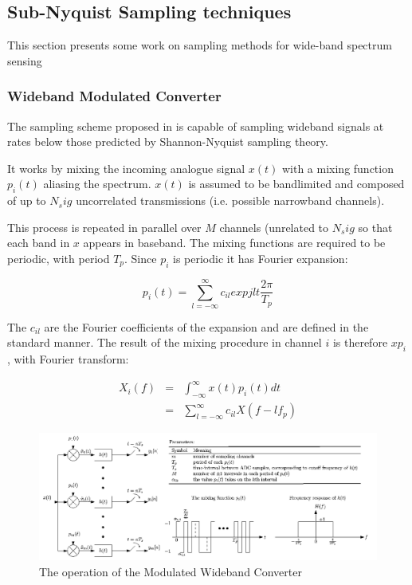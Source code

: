 \documentclass[12pt, a4paper]{article}
\begin{document}
\subsection{Sub-Nyquist Sampling techniques}
This section presents some work on sampling methods for wide-band spectrum sensing

\subsubsection{Wideband Modulated Converter} 
The sampling scheme proposed in \cite{Mishali2010} is capable of sampling wideband signals at rates below those predicted by Shannon-Nyquist sampling theory. 

It works by mixing the incoming analogue signal \(x\left(t\right)\) with a mixing function \(p_i\left(t\right)\) aliasing the spectrum. \(x\left(t\right)\) is assumed to be bandlimited and composed of up to \(N_sig\) uncorrelated transmissions (i.e. possible narrowband channels). 

This process is repeated in parallel over \(M\) channels (unrelated to \(N_sig\) so that each band in \(x\) appears in baseband. The mixing functions are required to be periodic, with period \(T_p\). Since \(p_i\) is periodic it has Fourier expansion:

\begin{equation}
p_i\left(t\right) = \sum_{l=-\infty}^{\infty} c_{il} exp{jlt\frac{2\pi}{T_p}}
\end{equation}

The \(c_{il}\) are the Fourier coefficients of the expansion and are defined in the standard manner. The result of the mixing procedure in channel \(i\) is therefore \(xp_i\), with Fourier transform:

\begin{align}
X_{i}\left(f\right) &=& \int_{-\infty}^{\infty} x\left(t\right) p_i\left(t\right) dt
\\ &=& \sum_{l=-\infty}^{\infty} c_{il} X\left(f-lf_p\right)
\end{align}

\begin{figure}[h]
\centering
\includegraphics[height = 7 cm, width=\textwidth]{mwc.png}
\caption{The operation of the Modulated Wideband Converter \cite{Mischali2010}}
\label{bayesiancs}
\end{figure}
\end{document}
